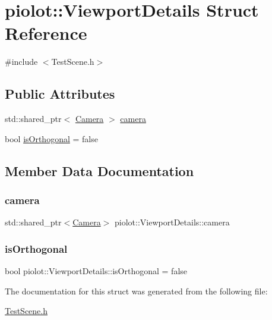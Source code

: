 \hypertarget{structpiolot_1_1_viewport_details}{}\section{piolot\+:\+:Viewport\+Details Struct Reference}
\label{structpiolot_1_1_viewport_details}


{\ttfamily \#include $<$Test\+Scene.\+h$>$}

\subsection*{Public Attributes}
\begin{DoxyCompactItemize}
\item 
std\+::shared\+\_\+ptr$<$ \mbox{\hyperlink{classpiolot_1_1_camera}{Camera}} $>$ \mbox{\hyperlink{structpiolot_1_1_viewport_details_ae1d4ed0dd422ab73a97df92029403adc}{camera}}
\item 
bool \mbox{\hyperlink{structpiolot_1_1_viewport_details_aabc49675aefc2a8adfb75939a6cfcb81}{is\+Orthogonal}} = false
\end{DoxyCompactItemize}


\subsection{Member Data Documentation}
\mbox{\label{structpiolot_1_1_viewport_details_ae1d4ed0dd422ab73a97df92029403adc}} 
\subsubsection{\texorpdfstring{camera}{camera}}
{\footnotesize\ttfamily std\+::shared\+\_\+ptr$<$\mbox{\hyperlink{classpiolot_1_1_camera}{Camera}}$>$ piolot\+::\+Viewport\+Details\+::camera}

\mbox{\label{structpiolot_1_1_viewport_details_aabc49675aefc2a8adfb75939a6cfcb81}} 
\subsubsection{\texorpdfstring{is\+Orthogonal}{isOrthogonal}}
{\footnotesize\ttfamily bool piolot\+::\+Viewport\+Details\+::is\+Orthogonal = false}



The documentation for this struct was generated from the following file\+:\begin{DoxyCompactItemize}
\item 
\mbox{\hyperlink{_test_scene_8h}{Test\+Scene.\+h}}\end{DoxyCompactItemize}
